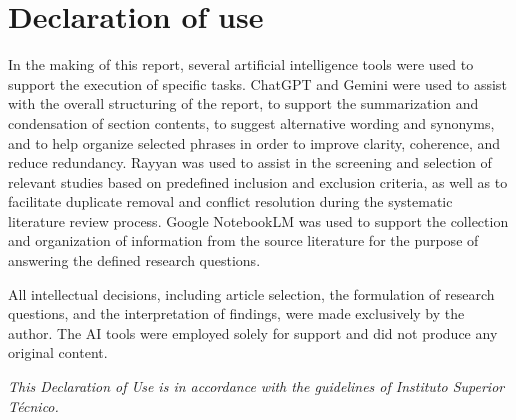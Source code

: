 \section*{Declaration of use}

In the making of this report, several artificial intelligence tools were used to support the execution of specific tasks. ChatGPT and Gemini were used to assist with the overall structuring of the report, to support the summarization and condensation of section contents, to suggest alternative wording and synonyms, and to help organize selected phrases in order to improve clarity, coherence, and reduce redundancy. Rayyan was used to assist in the screening and selection of relevant studies based on predefined inclusion and exclusion criteria, as well as to facilitate duplicate removal and conflict resolution during the systematic literature review process. Google NotebookLM was used to support the collection and organization of information from the source literature for the purpose of answering the defined research questions.

All intellectual decisions, including article selection, the formulation of research questions, and the interpretation of findings, were made exclusively by the author. The AI tools were employed solely for support and did not produce any original content.

\textit{This Declaration of Use is in accordance with the guidelines of Instituto Superior Técnico.}
